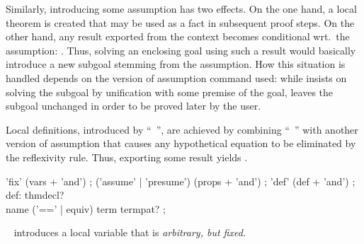 \begin{isabellebody}
\begin{isamarkuptext}
  Similarly, introducing some assumption \isa{{\isasymchi}} has two effects.
  On the one hand, a local theorem is created that may be used as a
  fact in subsequent proof steps.  On the other hand, any result
  \isa{{\isachardoublequote}{\isasymchi}\ {\isasymturnstile}\ {\isasymphi}{\isachardoublequote}} exported from the context becomes conditional wrt.\
  the assumption: \isa{{\isachardoublequote}{\isasymturnstile}\ {\isasymchi}\ {\isasymLongrightarrow}\ {\isasymphi}{\isachardoublequote}}.  Thus, solving an enclosing goal
  using such a result would basically introduce a new subgoal stemming
  from the assumption.  How this situation is handled depends on the
  version of assumption command used: while \hyperlink{command.assume}{\mbox{}}
  insists on solving the subgoal by unification with some premise of
  the goal, \hyperlink{command.presume}{\mbox{}} leaves the subgoal unchanged in order
  to be proved later by the user.

  Local definitions, introduced by ``\hyperlink{command.def}{\mbox{}}~'', are achieved by combining ``\hyperlink{command.fix}{\mbox{}}~'' with
  another version of assumption that causes any hypothetical equation
  \isa{{\isachardoublequote}x\ {\isasymequiv}\ t{\isachardoublequote}} to be eliminated by the reflexivity rule.  Thus,
  exporting some result  yields .

  \begin{rail}
    'fix' (vars + 'and')
    ;
    ('assume' | 'presume') (props + 'and')
    ;
    'def' (def + 'and')
    ;
    def: thmdecl? \\ name ('==' | equiv) term termpat?
    ;
  \end{rail}

  \begin{description}
  
  \item \hyperlink{command.fix}{\mbox{}}~ introduces a local variable  that is \emph{arbitrary, but fixed.}
  

\end{description}
\end{isamarkuptext}
\end{isabellebody}
